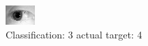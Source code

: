 \begin{figure}[h!]
\begin{center}
\includegraphics[width=0.60\columnwidth]{figures/ID1234_class_3_target_4.png}
\end{center}
\caption{ Classification: 3 actual target: 4}
\label{fig:ID1234_class_3_target_4}
\end{figure}
